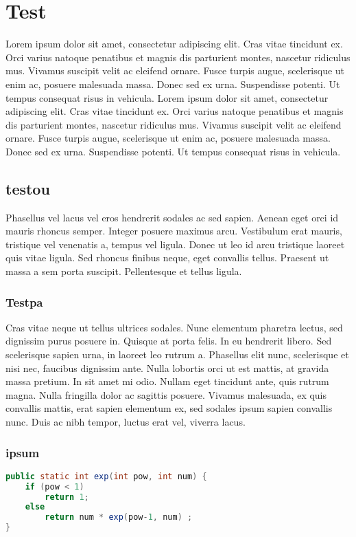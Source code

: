\documentclass{core/report-template}
\begin{document}

\tableofcontents
\newpage
\setcounter{page}{1}

\section{Test}
Lorem ipsum dolor sit amet, consectetur adipiscing elit. Cras vitae tincidunt ex. Orci varius natoque penatibus et magnis dis parturient montes, nascetur ridiculus mus. Vivamus suscipit velit ac eleifend ornare. Fusce turpis augue, scelerisque ut enim ac, posuere malesuada massa. Donec sed ex urna. Suspendisse potenti. Ut tempus consequat risus in vehicula.
Lorem ipsum dolor sit amet, consectetur adipiscing elit. Cras vitae tincidunt ex. Orci varius natoque penatibus et magnis dis parturient montes, nascetur ridiculus mus. Vivamus suscipit velit ac eleifend ornare. Fusce turpis augue, scelerisque ut enim ac, posuere malesuada massa. Donec sed ex urna. Suspendisse potenti. Ut tempus consequat risus in vehicula.

\subsection{testou}
Phasellus vel lacus vel eros hendrerit sodales ac sed sapien. Aenean eget orci id mauris rhoncus semper. Integer posuere maximus arcu. Vestibulum erat mauris, tristique vel venenatis a, tempus vel ligula. Donec ut leo id arcu tristique laoreet quis vitae ligula. Sed rhoncus finibus neque, eget convallis tellus. Praesent ut massa a sem porta suscipit. Pellentesque et tellus ligula.

\subsubsection{Testpa}
Cras vitae neque ut tellus ultrices sodales. Nunc elementum pharetra lectus, sed dignissim purus posuere in. Quisque at porta felis. In eu hendrerit libero. Sed scelerisque sapien urna, in laoreet leo rutrum a. Phasellus elit nunc, scelerisque et nisi nec, faucibus dignissim ante. Nulla lobortis orci ut est mattis, at gravida massa pretium. In sit amet mi odio. Nullam eget tincidunt ante, quis rutrum magna. Nulla fringilla dolor ac sagittis posuere. Vivamus malesuada, ex quis convallis mattis, erat sapien elementum ex, sed sodales ipsum sapien convallis nunc. Duis ac nibh tempor, luctus erat vel, viverra lacus. 

\subsubsection{ipsum}
\begin{lstlisting}[language=Java,caption=Some Java code ]
    public static int exp(int pow, int num) {
    if (pow < 1) 
        return 1; 
    else
        return num * exp(pow-1, num) ;
}
\end{lstlisting}
\end{document}
